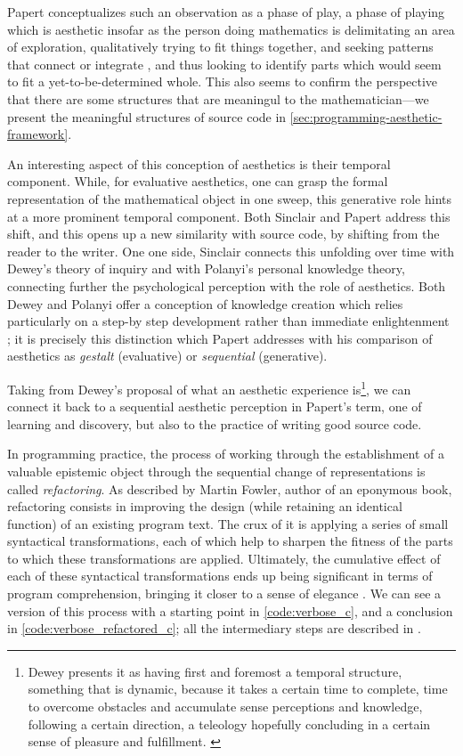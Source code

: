 Papert conceptualizes such an observation as a phase of play, a phase of playing which is aesthetic insofar as the person doing mathematics is delimitating an area of exploration, qualitatively trying to fit things together, and seeking patterns that connect or integrate \citep{papert_mathematical_1978}, and thus looking to identify parts which would seem to fit a yet-to-be-determined whole. This also seems to confirm the perspective that there are some structures that are meaningul to the mathematician—we present the meaningful structures of source code in \ref{sec:programming-aesthetic-framework}.

An interesting aspect of this conception of aesthetics is their temporal component. While, for evaluative aesthetics, one can grasp the formal representation of the mathematical object in one sweep, this generative role hints at a more prominent temporal component. Both Sinclair and Papert address this shift, and this opens up a new similarity with source code, by shifting from the reader to the writer. One one side, Sinclair connects this unfolding over time with Dewey's theory of inquiry and with Polanyi's personal knowledge theory, connecting further the psychological perception with the role of aesthetics. Both Dewey and Polanyi offer a conception of knowledge creation which relies particularly on a step-by step development rather than immediate enlightenment \citep{polanyi_knowing_1969,sinclair_roles_2004}; it is precisely this distinction which Papert addresses with his comparison of aesthetics as \emph{gestalt} (evaluative) or \emph{sequential} (generative).

Taking from Dewey's proposal of what an aesthetic experience is\footnote{Dewey presents it as having first and foremost a temporal structure, something that is dynamic, because it takes a certain time to complete, time to overcome obstacles and accumulate sense perceptions and knowledge, following a certain direction, a teleology hopefully concluding in a certain sense of pleasure and fulfillment. \citep{leddy_dewey_2021}}, we can connect it back to a sequential aesthetic perception in Papert's term, one of learning and discovery, but also to the practice of writing good source code.

In programming practice, the process of working through the establishment of a valuable epistemic object through the sequential change of representations is called \emph{refactoring}. As described by Martin Fowler, author of an eponymous book, refactoring consists in improving the design (while retaining an identical function) of an existing program text. The crux of it is applying a series of small syntactical transformations, each of which help to sharpen the fitness of the parts to which these transformations are applied. Ultimately, the cumulative effect of each of these syntactical transformations ends up being significant in terms of program comprehension, bringing it closer to a sense of elegance \citep{fowler_refactoring_1999}. We can see a version of this process with a starting point in \ref{code:verbose_c}, and a conclusion in \ref{code:verbose_refactored_c}; all the intermediary steps are described in \citep{muratori_semantic_2014}.

